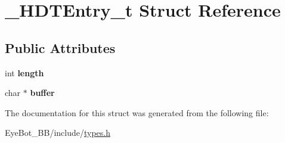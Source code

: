 \hypertarget{struct___h_d_t_entry__t}{\section{\-\_\-\-H\-D\-T\-Entry\-\_\-t \-Struct \-Reference}
\label{struct___h_d_t_entry__t}
}
\subsection*{\-Public \-Attributes}
\begin{DoxyCompactItemize}
\item 
\hypertarget{struct___h_d_t_entry__t_ac24c2d2d6a431fcfd38b356e78836e1e}{int {\bfseries length}}\label{struct___h_d_t_entry__t_ac24c2d2d6a431fcfd38b356e78836e1e}

\item 
\hypertarget{struct___h_d_t_entry__t_a711502276706bb827e97786e6cea284b}{char $\ast$ {\bfseries buffer}}\label{struct___h_d_t_entry__t_a711502276706bb827e97786e6cea284b}

\end{DoxyCompactItemize}


\-The documentation for this struct was generated from the following file\-:\begin{DoxyCompactItemize}
\item 
\-Eye\-Bot\-\_\-\-B\-B/include/\hyperlink{types_8h}{types.\-h}\end{DoxyCompactItemize}
